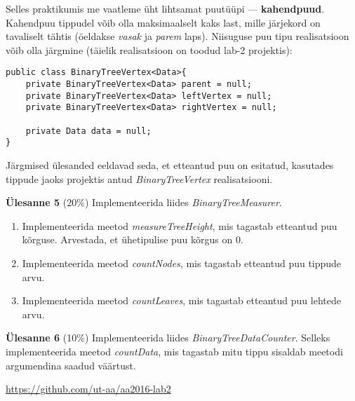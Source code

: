 \documentclass[a4paper]{article}
\begin{document}
Selles praktikumis me vaatleme üht lihtsamat puutüüpi --- \textbf{kahendpuud}. Kahendpuu tippudel võib olla maksimaalselt kaks last, mille järjekord on tavaliselt tähtis (öeldakse \emph{vasak} ja \emph{parem} laps). Niisuguse puu tipu realisatsioon võib olla järgmine (täielik realisatsioon on toodud lab-2 projektis):

\begin{lstlisting}
public class BinaryTreeVertex<Data>{
	private BinaryTreeVertex<Data> parent = null;
	private BinaryTreeVertex<Data> leftVertex = null;
	private BinaryTreeVertex<Data> rightVertex = null;
	
	private Data data = null;
}
\end{lstlisting}

Järgmised ülesanded eeldavad seda, et etteantud puu on esitatud, kasutades tippude jaoks projektis antud \textit{BinaryTreeVertex} realisatsiooni.

\begin{problem}
\textbf{Ülesanne 5} (20\%)
\newline
Implementeerida liides \textit{BinaryTreeMeasurer}.
\begin{enumerate}
\item
Implementeerida meetod \textit{measureTreeHeight}, mis tagastab etteantud puu kõrguse.
Arvestada, et ühetipulise puu kõrgus on 0.
\item
Implementeerida meetod \textit{countNodes}, mis tagastab etteantud puu tippude arvu.
\item
Implementeerida meetod \textit{countLeaves}, mis tagastab etteantud puu lehtede arvu.
\end{enumerate}
\end{problem}

\begin{problem}
\textbf{Ülesanne 6} (10\%)
\newline
Implementeerida liides \textit{BinaryTreeDataCounter}. Selleks implementeerida meetod \textit{countData}, mis tagastab mitu tippu sisaldab meetodi argumendina saadud väärtust.
\end{problem}

\url{https://github.com/ut-aa/aa2016-lab2}
\end{document}
